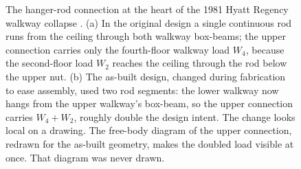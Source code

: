 \begin{figure}[htbp]
\caption[Hyatt Regency: the load path that the redrawn FBD would have
caught]{The hanger-rod connection at the heart of the 1981 Hyatt
Regency walkway collapse \cite{acc:nbs-hyatt-1982}. (a) In the original
design a single continuous rod runs from the ceiling through both
walkway box-beams; the upper connection carries only the fourth-floor
walkway load $W_4$, because the second-floor load $W_2$ reaches the
ceiling through the rod below the upper nut. (b) The as-built design,
changed during fabrication to ease assembly, used two rod segments: the
lower walkway now hangs from the upper walkway's box-beam, so the upper
connection carries $W_4 + W_2$, roughly double the design intent. The
change looks local on a drawing. The free-body diagram of the upper
connection, redrawn for the as-built geometry, makes the doubled load
visible at once. That diagram was never drawn.}
\label{fig:vol03ch01:hyatt-loadpath}
\end{figure}
